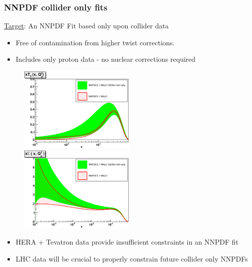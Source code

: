 \documentclass[10pt]{beamer}
\begin{document}
\begin{frame}
\frametitle{ NNPDF collider only fits }

\underline{Target}: An NNPDF Fit based only upon collider data
\begin{itemize}
\item<1-> Free of contamination from higher twist corrections.
\item<1-> Includes only proton data - no nuclear corrections required
\end{itemize}

 \begin{figure}[b!]
    \begin{center}
      \includegraphics[width=0.50\textwidth]{xT3_Q_2_log-nnpdf21nnlo-collider.eps}
      \includegraphics[width=0.50\textwidth]{xSinglet_Q_2_log-nnpdf21nnlo-collider.eps}
    \end{center}
    \vskip-0.5cm
    \label{fig:pdf-jets}
\end{figure}
\begin{itemize}
\item<1->HERA + Tevatron data provide insufficient constraints in an NNPDF fit
\end{itemize}

\begin{itemize}
\item<1-> LHC data will be crucial to properly constrain future collider only NNPDFs
\end{itemize}
\end{frame}
\end{document}
